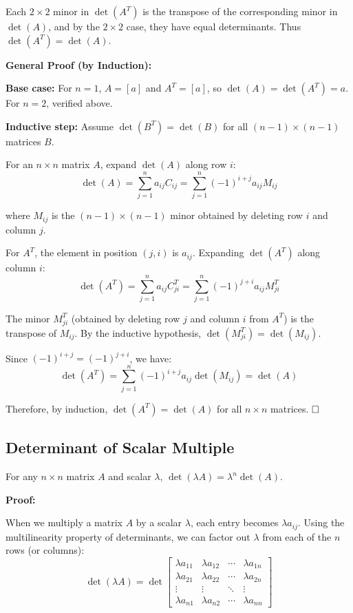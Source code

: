 Each $2 \times 2$ minor in $\det(A^T)$ is the transpose of the corresponding minor in $\det(A)$, and by the $2 \times 2$ case, they have equal determinants. Thus $\det(A^T) = \det(A)$.

\vspace{0.5em}

\textbf{General Proof (by Induction):}

\textbf{Base case:} For $n=1$, $A = [a]$ and $A^T = [a]$, so $\det(A) = \det(A^T) = a$. For $n=2$, verified above.

\textbf{Inductive step:} Assume $\det(B^T) = \det(B)$ for all $(n-1) \times (n-1)$ matrices $B$.

For an $n \times n$ matrix $A$, expand $\det(A)$ along row $i$:
$$\det(A) = \sum_{j=1}^{n} a_{ij} C_{ij} = \sum_{j=1}^{n} (-1)^{i+j} a_{ij} M_{ij}$$

where $M_{ij}$ is the $(n-1) \times (n-1)$ minor obtained by deleting row $i$ and column $j$.

For $A^T$, the element in position $(j,i)$ is $a_{ij}$. Expanding $\det(A^T)$ along column $i$:
$$\det(A^T) = \sum_{j=1}^{n} a_{ij} C^T_{ji} = \sum_{j=1}^{n} (-1)^{j+i} a_{ij} M^T_{ji}$$

The minor $M^T_{ji}$ (obtained by deleting row $j$ and column $i$ from $A^T$) is the transpose of $M_{ij}$. By the inductive hypothesis, $\det(M^T_{ji}) = \det(M_{ij})$.

Since $(-1)^{i+j} = (-1)^{j+i}$, we have:
$$\det(A^T) = \sum_{j=1}^{n} (-1)^{i+j} a_{ij} \det(M_{ij}) = \det(A)$$

Therefore, by induction, $\det(A^T) = \det(A)$ for all $n \times n$ matrices. $\hfill \square$

\subsection{Determinant of Scalar Multiple}
\label{appendix:det-scalar}

\begin{tcolorbox}[colback=blue!5!white,colframe=blue!75!black,title=Theorem]
For any $n \times n$ matrix $A$ and scalar $\lambda$, $\det(\lambda A) = \lambda^n \det(A)$.
\end{tcolorbox}

\textbf{Proof:}

When we multiply a matrix $A$ by a scalar $\lambda$, each entry becomes $\lambda a_{ij}$. Using the multilinearity property of determinants, we can factor out $\lambda$ from each of the $n$ rows (or columns):
$$\det(\lambda A) = \det\begin{bmatrix} \lambda a_{11} & \lambda a_{12} & \cdots & \lambda a_{1n} \\ \lambda a_{21} & \lambda a_{22} & \cdots & \lambda a_{2n} \\ \vdots & \vdots & \ddots & \vdots \\ \lambda a_{n1} & \lambda a_{n2} & \cdots & \lambda a_{nn} \end{bmatrix}$$

